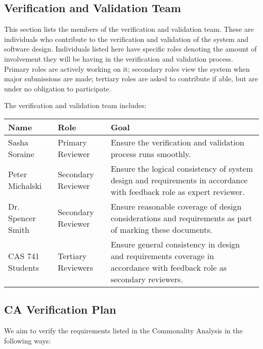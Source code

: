 \documentclass[12pt, titlepage]{article}
\begin{document}
\subsection{Verification and Validation Team}
This section lists the members of the verification and validation team. These 
are individuals who contribute to the verification and validation of the system 
and software design. Individuals listed here have specific roles denoting the 
amount of involvement they will be having in the verification and validation 
process. Primary roles are actively working on it; secondary roles view the 
system when major submissions are made; tertiary roles are asked to contribute 
if able, but are under no obligation to participate.

The verification and validation team includes:

\begin{table}[h]
	\begin{tabular}{|l|l|p{8cm}|}
		\hline
		\textbf{Name} & \textbf{Role} & \textbf{Goal} \\
		\hline
		Sasha Soraine & Primary Reviewer& Ensure the verification and 
		validation 
		process runs smoothly.\\
		Peter Michalski & Secondary Reviewer& Ensure the logical consistency of 
		system 
		design and requirements in accordance with feedback role as expert 
		reviewer. \\
		Dr. Spencer Smith & Secondary Reviewer& Ensure reasonable coverage of 
		design 
		considerations and requirements as part of marking these documents. \\
		CAS 741 Students & Tertiary Reviewers& Ensure general consistency in 
		design and 
		requirements coverage in accordance with feedback role as secondary 
		reviewers.\\
		\hline
	\end{tabular}
\end{table}


\pagebreak
\subsection{CA Verification Plan}

We aim to verify the requirements listed in the Commonality Analysis in the 
following ways:
\end{document}
